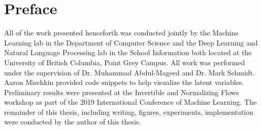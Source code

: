 
\chapter{Preface}

All of the work presented henceforth was conducted jointly by the Machine Learning lab in the Department of Computer Science and the Deep Learning and Natural Language Processing lab in the School Information both located at the University of British Columbia, Point Grey Campus. All work was performed under the supervision of Dr. Muhammad Abdul-Mageed and Dr. Mark Schmidt. Aaron Mischkin provided code snippets to help visualize the latent variables. Preliminary results were presented at the Invertible and Normalizing Flows workshop as part of the 2019 International Conference of Machine Learning. The remainder of this thesis, including writing, figures, experiments, implementation were conducted by the author of this thesis.

